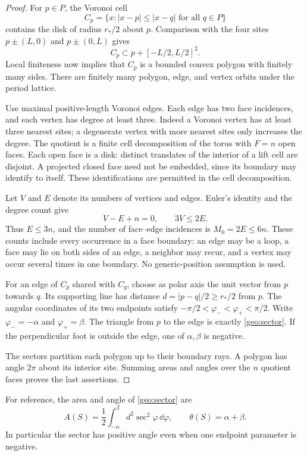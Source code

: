 \begin{proof}
For \(p\in P\), the Voronoi cell
\[
 C_p=\{x:|x-p|\leq|x-q|\text{ for all }q\in P\}
\]
contains the disk of radius \(r_*/2\) about \(p\).  Comparison with
the four sites \(p\pm(L,0)\) and \(p\pm(0,L)\) gives
\[
 C_p\subset p+[-L/2,L/2]^2.
\]
Local finiteness now implies that \(C_p\) is a bounded convex
polygon with finitely many sides.  There are finitely many
polygon, edge, and vertex orbits under the period lattice.

Use maximal positive-length Voronoi edges.  Each edge has two
face incidences, and each vertex has degree at least three.
Indeed a Voronoi vertex has at least three nearest sites; a
degenerate vertex with more nearest sites only increases the
degree.  The quotient is a finite cell decomposition of the
torus with \(F=n\) open faces.  Each open face is a disk: distinct
translates of the interior of a lift cell are disjoint.
A projected closed face need not be embedded, since its boundary
may identify to itself.  These identifications are permitted in
the cell decomposition.

Let \(V\) and \(E\) denote its numbers of vertices and edges.
Euler's identity and the degree count give
\[
 V-E+n=0,\qquad 3V\leq2E.
\]
Thus \(E\leq3n\), and the number of face--edge incidences is
\(M_0=2E\leq6n\).  These counts include every occurrence in a
face boundary: an edge may be a loop, a face may lie on both
sides of an edge, a neighbor may recur, and a vertex may occur
several times in one boundary.  No generic-position assumption
is used.

For an edge of \(C_p\) shared with \(C_q\), choose as polar axis
the unit vector from \(p\) towards \(q\).  Its supporting line
has distance \(d=|p-q|/2\geq r_*/2\) from \(p\).
The angular coordinates of its two endpoints satisfy
\(-\pi/2<\varphi_-<\varphi_+<\pi/2\).  Write
\(\varphi_-=-\alpha\) and \(\varphi_+=\beta\).
The triangle from \(p\) to the edge is exactly
\eqref{geo:sector}.  If the perpendicular foot is outside the
edge, one of \(\alpha,\beta\) is negative.

The sectors partition each polygon up to their boundary rays.
A polygon has angle \(2\pi\) about its interior site.  Summing
areas and angles over the \(n\) quotient faces proves the last
assertions.
\end{proof}

For reference, the area and angle of \eqref{geo:sector} are
\begin{equation}
 A(S)=\frac12\int_{-\alpha}^{\beta}d^2\sec^2\varphi\,\dd\varphi,
 \qquad
 \theta(S)=\alpha+\beta.
 \label{geo:area-angle}
\end{equation}
In particular the sector has positive angle even when one endpoint
parameter is negative.

